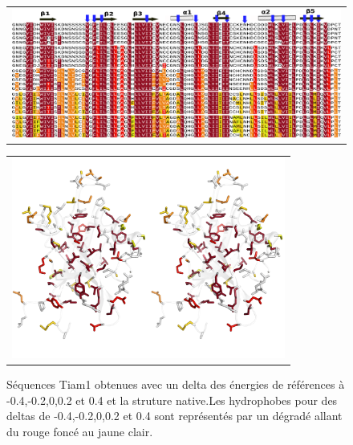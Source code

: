     \clearpage
\begin{landscape}

   \begin{figure}[t]
     \centering
     \begin{tabular}{c}
       \includegraphics[width=18cm]{boost_hydro/modelA/alignTIAM1.png} \\
     \end{tabular}
\label{result:PDZ_seed}
   \end{figure}

   \begin{figure}[t]
     \centering
     \begin{tabular}{c}
       \includegraphics[width=9cm]{boost_hydro/modelA/structureTIAM1.png} \\
     \end{tabular}

     \caption{\small Séquences Tiam1 obtenues avec un delta des énergies de références à -0.4,-0.2,0,0.2 et 0.4 et la struture native.Les hydrophobes pour des deltas de -0.4,-0.2,0,0.2 et 0.4 sont représentés par un dégradé allant du rouge foncé au jaune clair.}

\label{result:PDZ_seed}
   \end{figure}

\end{landscape}


